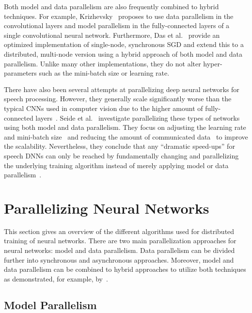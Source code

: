 \documentclass[conference]{IEEEtran}
\begin{document}
Both model and data parallelism are also frequently combined to hybrid techniques.
For example, Krizhevsky~\cite{krizhevsky2014-One-weird-trick} proposes to use data parallelism in the convolutional layers and model parallelism in the fully-connected layers of a single convolutional neural network.
%
Furthermore, Das et al.~\cite{das2016-Distributed-deep-learning} provide an optimized implementation of single-node, synchronous SGD and extend this to a distributed, multi-node version using a hybrid approach of both model and data parallelism.
Unlike many other implementations, they do not alter hyper-parameters such as the mini-batch size or learning rate.

There have also been several attempts at parallelizing deep neural networks for speech processing.
However, they generally scale significantly worse than the typical CNNs used in computer vision due to the higher amount of fully-connected layers~\cite{dean2012-Large-scale-distributed,seide2014-Speech-DNNs}.
Seide et al.~\cite{seide2014-Speech-DNNs,seide2014-1-bit-stochastic} investigate parallelizing these types of networks using both model and data parallelism.
They focus on adjusting the learning rate and mini-batch size~\cite{seide2014-Speech-DNNs} and reducing the amount of communicated data~\cite{seide2014-1-bit-stochastic} to improve the scalability.
Nevertheless, they conclude that any ``dramatic speed-ups'' for speech DNNs can only be reached by fundamentally changing and parallelizing the underlying training algorithm instead of merely applying model or data parallelism~\cite{seide2014-Speech-DNNs,seide2014-1-bit-stochastic}.


\section{Parallelizing Neural Networks} %
\label{sec:parallelizing_neural_networks}
This section gives an overview of the different algorithms used for distributed training of neural networks.
There are two main parallelization approaches for neural networks: model and data parallelism.
Data parallelism can be divided further into synchronous and asynchronous approaches.
Moreover, model and data parallelism can be combined to hybrid approaches to utilize both techniques as demonstrated, for example, by~\cite{krizhevsky2014-One-weird-trick,das2016-Distributed-deep-learning}.

\subsection{Model Parallelism} %
\label{sub:model_parallelism}
\end{document}
